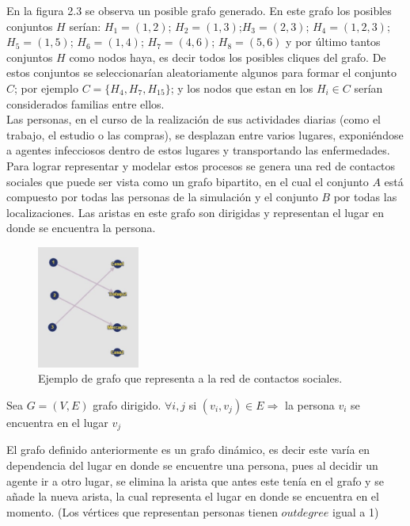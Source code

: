 En la figura 2.3 se observa un posible grafo generado. En este grafo los posibles conjuntos $H$ serían: 
$H_{1} = (1,2)$; $H_{2}=(1,3)$;$H_{3}=(2,3)$; $H_{4} = (1,2,3)$; $H_{5} = (1,5)$; $H_{6}=(1,4)$; $H_{7} = (4,6)$; $H_{8} = (5,6)$ y por último tantos conjuntos $H$ como nodos haya, es decir
todos los posibles cliques del grafo. De estos conjuntos se seleccionarían aleatoriamente algunos para formar el conjunto $C$;
por ejemplo $C = \lbrace H_{4}, H_{7}, H_{15} \rbrace$; y los nodos que estan en los $H_{i} \in C$ serían considerados
familias entre ellos.\\

Las personas, en el curso de la realización de sus actividades diarias (como el trabajo, el estudio o las compras),
se desplazan entre varios lugares, exponiéndose a agentes infecciosos dentro de estos lugares y transportando las
enfermedades. Para lograr representar y modelar estos procesos se genera una red de contactos sociales que puede
ser vista como un grafo bipartito, en el cual el conjunto $A$ está compuesto por todas las personas de la simulación
y el conjunto $B$ por todas las localizaciones. Las aristas en este grafo son dirigidas y representan 
el lugar en donde se encuentra la persona.\\


\begin{figure}[htb]
    \centering
    \includegraphics[width=0.3\textwidth]{Graphics/Grafo_Loc_Pers.jpeg}
    \caption{Ejemplo de grafo que representa a la red de contactos sociales.}
\end{figure}

\begin{center}
    Sea $G = (V,E)$ grafo dirigido. 
    $\forall i,j$ si $(v_i,v_j) \in E \Rightarrow$ la persona $v_i$ se encuentra en el lugar $v_j$ 
\end{center}

El grafo definido anteriormente es un grafo dinámico, es decir este varía en dependencia del lugar en donde se encuentre
una persona, pues al decidir un agente ir a otro lugar, se elimina la arista que antes este tenía en el grafo y se 
añade la nueva arista, la cual representa el lugar en donde se encuentra en el momento. (Los vértices que representan
personas tienen $outdegree$ igual a 1)\\

